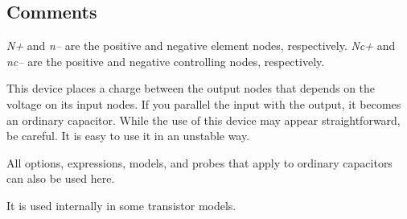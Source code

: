 \subsection{Comments}

{\it N+} and {\it n--} are the positive and negative element nodes,
respectively.  {\it Nc+} and {\it nc--} are the positive and negative
controlling nodes, respectively. 

This device places a charge between the output nodes that depends on
the voltage on its input nodes.  If you parallel the input with the
output, it becomes an ordinary capacitor.  While the use of this
device may appear straightforward, be careful.  It is easy to use it
in an unstable way.

All options, expressions, models, and probes that apply to ordinary
capacitors can also be used here.

It is used internally in some transistor models.
